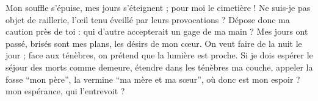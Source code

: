 Mon souffle s’épuise, mes jours s’éteignent ; pour moi le cimetière !
Ne suis-je pas objet de raillerie, l’œil tenu éveillé par leurs provocations ?
Dépose donc ma caution près de toi : qui d’autre accepterait un gage de ma main ?
Mes jours ont passé, brisés sont mes plans, les désirs de mon cœur.
On veut faire de la nuit le jour ; face aux ténèbres, on prétend que la lumière est proche.
Si je dois espérer le séjour des morts comme demeure, étendre dans les ténèbres ma couche, 
appeler la fosse “mon père”, la vermine “ma mère et ma sœur”,
où donc est mon espoir ? mon espérance, qui l’entrevoit ?